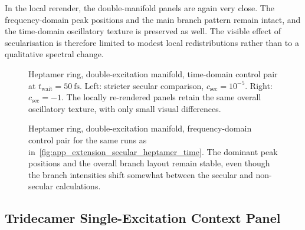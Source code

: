 In the local rerender, the double-manifold panels are again very close. The
frequency-domain peak positions and the main branch pattern remain intact, and
the time-domain oscillatory texture is preserved as well. The visible effect of
secularisation is therefore limited to modest local redistributions rather than
to a qualitative spectral change.

\begin{figure}[htbp]
    \centering
    \begin{minipage}[t]{0.49\linewidth}
        \centering
        \safeplaceholdergraphic[1.18\linewidth]{\heptamerDoubleSecTimePath}
    \end{minipage}\hfill
    \begin{minipage}[t]{0.49\linewidth}
        \centering
        \safeplaceholdergraphic[1.18\linewidth]{\heptamerDoubleNonSecTimePath}
    \end{minipage}
    \caption{Heptamer ring, double-excitation manifold, time-domain control
    pair at \(t_{\mathrm{wait}}=\SI{50}{\femto\second}\). Left: stricter
    secular comparison, \(c_{\mathrm{sec}}=10^{-5}\). Right:
    \(c_{\mathrm{sec}}=-1\). The locally re-rendered panels retain the same
    overall oscillatory texture, with only small visual differences.}
    \label{fig:app_extension_secular_heptamer_time}
\end{figure}

\begin{figure}[htbp]
    \centering
    \begin{minipage}[t]{0.49\linewidth}
        \centering
        \safeplaceholdergraphic[1.18\linewidth]{\heptamerDoubleSecFreqPath}
    \end{minipage}\hfill
    \begin{minipage}[t]{0.49\linewidth}
        \centering
        \safeplaceholdergraphic[1.18\linewidth]{\heptamerDoubleNonSecFreqPath}
    \end{minipage}
    \caption{Heptamer ring, double-excitation manifold, frequency-domain
    control pair for the same runs as
    in~\autoref{fig:app_extension_secular_heptamer_time}. The dominant peak
    positions and the overall branch layout remain stable, even though the
    branch intensities shift somewhat between the secular and non-secular
    calculations.}
    \label{fig:app_extension_secular_heptamer_freq}
\end{figure}

\subsection{Tridecamer Single-Excitation Context Panel}

